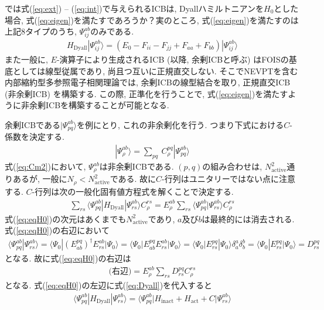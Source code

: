 \documentclass[11pt,pra,aps]{revtex4}
\begin{document}
では式(\ref{eq:ext}) -- (\ref{eq:int})で与えられるICBは, Dyallハミルトニアンを$H_0$とした場合, 式(\ref{eq:eigen})を満たすであろうか？実のところ, 式(\ref{eq:eigen})を満たすのは上記8タイプのうち, $\Psi_{ij}^{ab}$のみである. 
\begin{align}
  H_\text{Dyall}|\Psi_{ij}^{ab}\rangle=\left(E_0-F_{ii}-F_{jj}+F_{aa}+F_{bb}\right)|\Psi_{ij}^{ab}\rangle
\end{align}
また一般に, $E$-演算子により生成されるICB (以降, 余剰ICBと呼ぶ) はFOISの基底としては線型従属であり, 尚且つ互いに正規直交しない. そこでNEVPTを含む内部縮約型多参照電子相関理論では, 余剰ICBの線型結合を取り, 正規直交ICB (非余剰ICB) を構築する. この際, 正準化を行うことで, 式(\ref{eq:eigen})を満たすように非余剰ICBを構築することが可能となる. 

余剰ICBである$|\Psi_{pq}^{ab}\rangle$を例にとり, これの非余剰化を行う. つまり下式における$C$-係数を決定する. 
\begin{align}
  |\Psi_{\rho}^{ab}\rangle=\sum_{pq} \ C_{\rho}^{pq} |\Psi_{pq}^{ab}\rangle \label{eq:Cm2}
\end{align}
式(\ref{eq:Cm2})において, $\Psi_{\rho}^{ab}$は非余剰ICBである. $(p,q)$の組み合わせは, $N_\text{active}^2$通りあるが, 一般に$N_\rho<N_\text{active}^2$である. 故に$C$-行列はユニタリーではない点に注意する. $C$-行列は次の一般化固有値方程式を解くことで決定する. 
\begin{align}
  \sum_{rs} \langle\Psi_{pq}^{ab}|H_\text{Dyall}|\Psi_{rs}^{ab}\rangle C_\rho^{rs}=E_{\rho}^{ab}\sum_{rs} \langle\Psi_{pq}^{ab}|\Psi_{rs}^{ab}\rangle C_\rho^{rs} \label{eq:eqH0}
\end{align}
式(\ref{eq:eqH0})の次元はあくまでも$N_\text{active}^2$であり, $a$及び$b$は最終的には消去される. 式(\ref{eq:eqH0})の右辺において
\begin{align}
  \langle\Psi_{pq}^{ab}|\Psi_{rs}^{ab}\rangle = \langle\Psi_0|\left(E^{pq}_{ab}\right)^\dagger E_{rs}^{ab}|\Psi_0\rangle = \langle\Psi_0|E^{pq}_{ab}E_{rs}^{ab}|\Psi_0\rangle = \langle\Psi_0|E^{pq}_{rs}|\Psi_0\rangle \delta_a^a \delta_b^b = \langle\Psi_0|E^{pq}_{rs}|\Psi_0\rangle = D_{rs}^{pq}
\end{align}
となる. 故に式(\ref{eq:eqH0})の右辺は
\begin{align}
  \text{(右辺)}=E_\rho^{ab}\sum_{rs} D^{pq}_{rs} C_\rho^{rs}
\end{align}
となる. 式(\ref{eq:eqH0})の左辺に式(\ref{eq:Dyall})を代入すると
\begin{align}
  \langle\Psi_{pq}^{ab}|H_\text{Dyall}|\Psi_{rs}^{ab}\rangle = \langle\Psi_{pq}^{ab}|H_\text{inact}+H_\text{act}+C|\Psi_{rs}^{ab}\rangle
\end{align}
\end{document}
